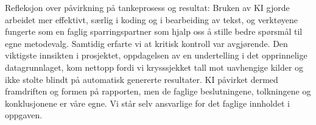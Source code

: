 \documentclass[
  norsk,
  11pt,
  a4paper,
]{article}
\begin{document}
Refleksjon over påvirkning på tankeprosess og resultat: Bruken av KI
gjorde arbeidet mer effektivt, særlig i koding og i bearbeiding av
tekst, og verktøyene fungerte som en faglig sparringspartner som hjalp
oss å stille bedre spørsmål til egne metodevalg. Samtidig erfarte vi at
kritisk kontroll var avgjørende. Den viktigste innsikten i prosjektet,
oppdagelsen av en undertelling i det opprinnelige datagrunnlaget, kom
nettopp fordi vi krysssjekket tall mot uavhengige kilder og ikke stolte
blindt på automatisk genererte resultater. KI påvirket dermed
framdriften og formen på rapporten, men de faglige beslutningene,
tolkningene og konklusjonene er våre egne. Vi står selv ansvarlige for
det faglige innholdet i oppgaven.
\end{document}

